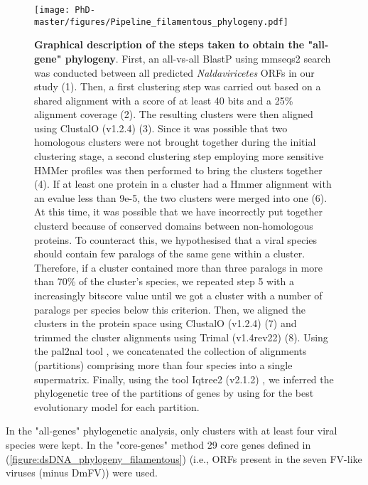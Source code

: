 \begin{figure}[!htpbt]
\texttt{[image: PhD-master/figures/Pipeline\_filamentous\_phylogeny.pdf]}\centering
\caption[Paper2:"All-gene" method pipeline abstract]{\textbf{Graphical description of the steps taken to obtain the "all-gene" phylogeny}. First, an all-vs-all BlastP using mmseqs2 search \citep{steinegger_mmseqs2_2017} was conducted between all predicted \textit{Naldaviricetes} ORFs in our study (1). Then, a first clustering step was carried out based on a shared alignment with a score of at least 40 bits and a 25\% alignment coverage (2). The resulting clusters were then aligned using ClustalO (v1.2.4) \citep{sievers_clustal_2018} (3). Since it was possible that two homologous clusters were not brought together during the initial clustering stage, a second clustering step employing more sensitive HMMer profiles was then performed to bring the clusters together (4). If at least one protein in a cluster had a Hmmer alignment with an evalue less than 9e-5, the two clusters were merged into one (6). At this time, it was possible that we have incorrectly put together clusterd because of conserved domains between non-homologous proteins. To counteract this, we hypothesised that a viral species should contain few paralogs of the same gene within a cluster. Therefore, if a cluster contained more than three paralogs in more than 70\% of the cluster's species, we repeated step 5 with a increasingly bitscore value until we got a cluster with a number of paralogs per species below this criterion. Then, we aligned the clusters in the protein space using ClustalO (v1.2.4) \citep{sievers_clustal_2018} (7) and trimmed the cluster alignments using Trimal (v1.4rev22) \citep{capella-gutierrez_trimal_2009} (8). Using the pal2nal tool \citep{suyama_pal2nal_2006}, we concatenated the collection of alignments (partitions) comprising more than four species into a single supermatrix. Finally, using the tool Iqtree2 (v2.1.2) \citep{minh_iq-tree_2020}, we inferred the phylogenetic tree of the partitions of genes by using for the best evolutionary model for each partition.}
\label{figure:Pipeline_filamentous_phylogeny}
\end{figure}


In the "all-genes" phylogenetic analysis, only clusters with at least four viral species were kept. In the "core-genes" method 29 core genes defined in (\figurename{\ref{figure:dsDNA_phylogeny_filamentous}}) (i.e., ORFs present in the seven FV-like viruses (minus DmFV)) were used. 

